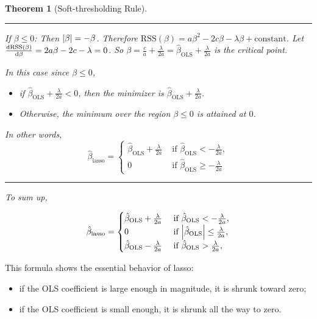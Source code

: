 \documentclass[
  letterpaper,
  DIV=11,
  numbers=noendperiod]{scrreprt}
\providecommand{\tightlist}{%
  \setlength{\itemsep}{0pt}\setlength{\parskip}{0pt}}
\newcommand{\rss}{\mathrm{RSS}}
\newcommand{\ols}{\mathrm{OLS}}
\newcommand{\lasso}{\mathrm{lasso}}
\newcommand{\constant}{\mathrm{constant}}
\theoremstyle{definition}
\theoremstyle{definition}
\theoremstyle{plain}
\newtheorem{theorem}{Theorem}[chapter]
\theoremstyle{plain}
\theoremstyle{remark}
\begin{document}
\begin{theorem}[Soft-thresholding
Rule]
\begin{center}\rule{0.5\linewidth}{0.5pt}\end{center}

If \(\beta\leq 0\): Then \(\abs{\beta}=-\beta\). Therefore
\(\rss(\beta)=a\beta^2-2c\beta-\lambda\beta+\constant\). Let
\(\dv{\rss(\beta)}{\beta}=2a\beta-2c-\lambda=0\). So
\(\beta=\frac ca+\frac{\lambda}{2a}=\hat\beta_\ols+\frac\lambda {2a}\)
is the critical point.

In this case since \(\beta\leq 0\),

\begin{itemize}
\tightlist
\item
  if \(\hat\beta_\ols+\frac\lambda {2a}<0\), then the minimizer is
  \(\hat\beta_\ols+\frac\lambda {2a}\).
\item
  Otherwise, the minimum over the region \(\beta\leq 0\) is attained at
  \(0\).
\end{itemize}

In other words, \[
\hat\beta_\lasso=\begin{cases}
\hat\beta_\ols+\frac\lambda{2a}& \text{ if }\hat\beta_\ols<-\frac\lambda{2a},\\
0& \text{ if }\hat\beta_\ols\geq -\frac\lambda{2a}
\end{cases}
\]

\begin{center}\rule{0.5\linewidth}{0.5pt}\end{center}

To sum up,

\[
\hat\beta_\lasso=\begin{cases}
\hat\beta_\ols+\frac\lambda{2a}& \text{ if }\hat\beta_\ols<-\frac\lambda{2a},\\
0& \text{ if }\abs{\hat\beta_\ols}\leq\frac\lambda{2a},\\
\hat\beta_\ols-\frac\lambda{2a}& \text{ if }\hat\beta_\ols> \frac\lambda{2a},\\
\end{cases}
\]

\end{theorem}

This formula shows the essential behavior of lasso:

\begin{itemize}
\tightlist
\item
  if the OLS coefficient is large enough in magnitude, it is shrunk
  toward zero;
\item
  if the OLS coefficient is small enough, it is shrunk all the way to
  zero.
\end{itemize}
\end{document}
